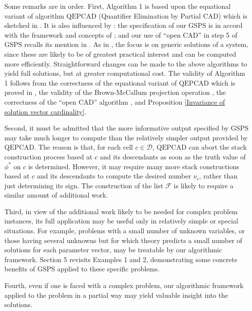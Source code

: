 \documentclass{article}
\begin{document}
Some remarks are in order. 
First, Algorithm 1 is based upon the
equational variant of algorithm $\mathrm{QEPCAD}$ 
(Quantifier Elimination by 
Partial CAD) which is sketched in \cite{McCallum2001}. 
It is also influenced
by \cite{LR07}: the specification of our 
$\mathrm{GSPS}$ is in accord with the framework and 
concepts of \cite{LR07};
and our use of ``open CAD'' in step 5 of $\mathrm{GSPS}$ recalls its
mention in \cite{LR07}.
As in \cite{LR07}, the focus is on generic solutions of a system,
since these are likely to be of greatest practical interest
and can be computed more efficiently.
Straightforward changes can be made to the above algorithms
to yield full solutions, but at greater computational cost.
The validity of Algorithm 1 follows from the correctness of
the equational variant of $\mathrm{QEPCAD}$ which is proved in 
\cite{McCallum2001},
the validity of the Brown-McCallum projection operation \cite{Brown2001},
the correctness of the ``open CAD'' algorithm \cite{McCallum1993, 
LR07}, and Proposition \ref{Invariance of solution vector cardinality}.

Second, it must be admitted that the more informative output specified
by $\mathrm{GSPS}$ may take much longer to compute than the
relatively simpler output provided by $\mathrm{QEPCAD}$.
The reason is that, for each cell $c \in \mathcal{D}$, 
$\mathrm{QEPCAD}$ 
can abort the stack construction process based at $c$ and its 
descendants as soon as the
truth value of $\phi^*$ on $c$ is determined. However, it may require
many more stack constructions based at $c$ and its descendants to 
compute the desired number $\nu_c$, rather than just determining its
sign. The construction of the list $\mathcal{F}$ is 
likely to require a similar amount of additional work.

Third, in view of the additional work likely to be needed for complex 
problem instances, its full application may be useful only in relatively 
simple or special situations. For example, problems with a small number 
of unknown variables, or those having several unknowns but for which 
theory predicts a small number of solutions for each parameter vector,
may be treatable by our algorithmic framework. Section 5 revisits 
Examples 1 and 2, demonstrating some concrete benefits of 
$\mathrm{GSPS}$ applied to these specific problems.

Fourth, even if one is faced with a complex problem, our algorithmic 
framework applied to the problem in a partial way may yield valuable 
insight into the solutions.
\end{document}
